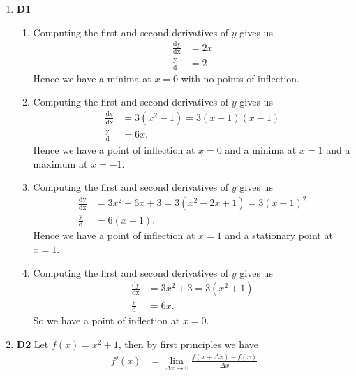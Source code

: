 \documentclass[12pt,oneside]{book}
\begin{document}
\begin{enumerate}
        \item \textbf{D1} \begin{enumerate}
            \item Computing the first and second derivatives of $y$ gives us \begin{align*}
                \frac{\mathop{\mathrm{d}y}}{\mathop{\mathrm{d}x}} &= 2x \\
                \frac{\mathop{\mathrm{d}^{2}y}}{\mathop{\mathrm{d}x^{2}}} &= 2
            \end{align*} Hence we have a minima at $x = 0$ with no points of inflection.
            \item Computing the first and second derivatives of $y$ gives us \begin{align*}
                \frac{\mathop{\mathrm{d}y}}{\mathop{\mathrm{d}x}} &= 3(x^2 - 1) = 3(x+1)(x-1) \\
                \frac{\mathop{\mathrm{d}^{2}y}}{\mathop{\mathrm{d}x^{2}}} &= 6x.
            \end{align*} Hence we have a point of inflection at $x = 0$ and a minima at $x = 1$ and a maximum at $x=-1$.
            \item Computing the first and second derivatives of $y$ gives us \begin{align*}
                \frac{\mathop{\mathrm{d}y}}{\mathop{\mathrm{d}x}} &= 3x^2 - 6x + 3 = 3(x^2 - 2x + 1) = 3(x - 1)^2 \\
                \frac{\mathop{\mathrm{d}^{2}y}}{\mathop{\mathrm{d}x^{2}}}  &= 6(x - 1).
            \end{align*}
            Hence we have a point of inflection at $x = 1$ and a stationary point at $x = 1$.
            \item Computing the first and second derivatives of $y$ gives us \begin{align*}
                \frac{\mathop{\mathrm{d}y}}{\mathop{\mathrm{d}x}} &= 3x^2 + 3 = 3(x^2+1) \\
                \frac{\mathop{\mathrm{d}^{2}y}}{\mathop{\mathrm{d}x^{2}}} &= 6x.
            \end{align*} So we have a point of inflection at $x = 0$. 
        \end{enumerate}
        \item \textbf{D2} Let $f(x) = x^2 + 1$, then by first principles we have \begin{align*}
            f'(x) &= \lim_{\Delta x \to 0} \frac{f(x + \Delta x) - f(x)}{\Delta x} \\ 

\end{align*}
\end{enumerate}
\end{document}
